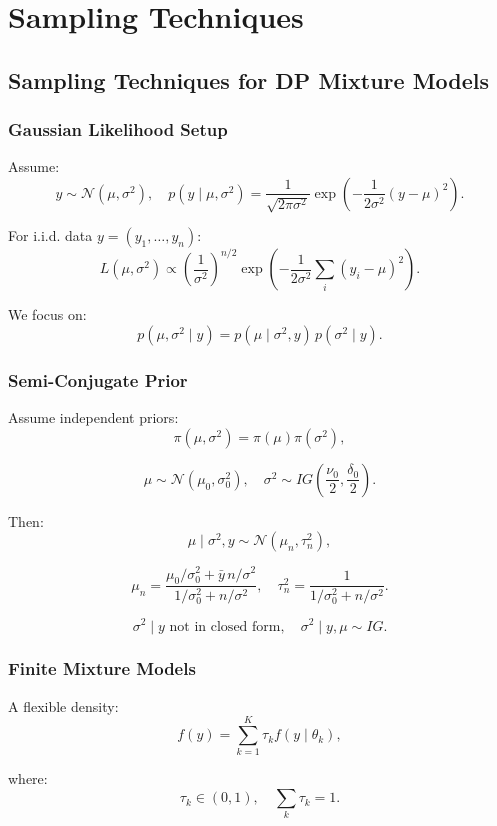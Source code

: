 \documentclass[12pt,oneside]{book}
\numberwithin{equation}{section}
\theoremstyle{definition}
\theoremstyle{plain}
\theoremstyle{remark}
\begin{document}
\chapter{Sampling Techniques}

\section{Sampling Techniques for DP Mixture Models}

\subsection*{Gaussian Likelihood Setup}

Assume:
\[
y \sim \mathcal{N}(\mu, \sigma^2),
\quad
p(y \mid \mu,\sigma^2) = \frac{1}{\sqrt{2\pi\sigma^2}} \exp\left(-\frac{1}{2\sigma^2}(y-\mu)^2\right).
\]

For i.i.d. data $y = (y_1,\dots,y_n)$:
\[
L(\mu,\sigma^2)
\propto
\left(\frac{1}{\sigma^2}\right)^{n/2}
\exp\left(-\frac{1}{2\sigma^2}\sum_i (y_i-\mu)^2\right).
\]

We focus on:
\[
p(\mu,\sigma^2 \mid y) = p(\mu \mid \sigma^2, y)\, p(\sigma^2 \mid y).
\]

\subsection*{Semi-Conjugate Prior}

Assume independent priors:
\[
\pi(\mu,\sigma^2) = \pi(\mu)\pi(\sigma^2),
\]

\[
\mu \sim \mathcal{N}(\mu_0,\sigma_0^2),
\quad
\sigma^2 \sim IG\left(\frac{\nu_0}{2}, \frac{\delta_0}{2}\right).
\]

Then:
\[
\mu \mid \sigma^2, y \sim \mathcal{N}(\mu_n, \tau_n^2),
\]

\[
\mu_n =
\frac{\mu_0/\sigma_0^2 + \bar{y}\, n/\sigma^2}{1/\sigma_0^2 + n/\sigma^2},
\quad
\tau_n^2 = \frac{1}{1/\sigma_0^2 + n/\sigma^2}.
\]

\[
\sigma^2 \mid y \text{ not in closed form}, \quad
\sigma^2 \mid y,\mu \sim IG.
\]

\subsection{Finite Mixture Models}

A flexible density:
\[
f(y) = \sum_{k=1}^K \tau_k f(y \mid \theta_k),
\]

where:
\[
\tau_k \in (0,1), \quad \sum_k \tau_k = 1.
\]
\end{document}
